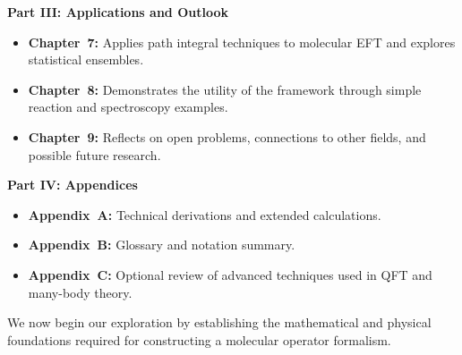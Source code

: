 \textbf{Part III: Applications and Outlook}
\begin{itemize}
	\item \textbf{Chapter~7:} Applies path integral techniques to molecular EFT and explores statistical ensembles.
	\item \textbf{Chapter~8:} Demonstrates the utility of the framework through simple reaction and spectroscopy examples.
	\item \textbf{Chapter~9:} Reflects on open problems, connections to other fields, and possible future research.
\end{itemize}

\textbf{Part IV: Appendices}
\begin{itemize}
	\item \textbf{Appendix~A:} Technical derivations and extended calculations.
	\item \textbf{Appendix~B:} Glossary and notation summary.
	\item \textbf{Appendix~C:} Optional review of advanced techniques used in QFT and many-body theory.
\end{itemize}

We now begin our exploration by establishing the mathematical and physical foundations required for constructing a molecular operator formalism.

